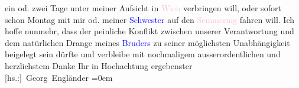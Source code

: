                     ein od. zwei Tage unter meiner Aufsicht in \textcolor{pink}{Wien}{}\ledrightnote{\textcolor{pink}{Wien}}
                    verbringen will, oder sofort schon Montag mit mir od. meiner \textcolor{blue}{Schwester}{} auf den \textcolor{pink}{Semmering}{}\ledrightnote{\textcolor{pink}{Semmering}} fahren will.\pend
           \pstart
           Ich hoffe nunmehr, dass der peinliche Konflikt zwischen unserer Verantwortung und
                    dem natürlichen Drange meines \textcolor{blue}{Bruders}{} zu seiner möglichsten Unabhängigkeit beigelegt sein dürfte und
                    verbleibe mit nochmaligem ausserordentlichen und herzlichstem Danke Ihr in\pend
           \pstart
           Hochachtung ergebenster{\\[\baselineskip]}\spacefill\mbox{{[}hs.:{]} Georg
                    Engländer}\pend
           \leftskip=0em{}\endnumbering{}  
      